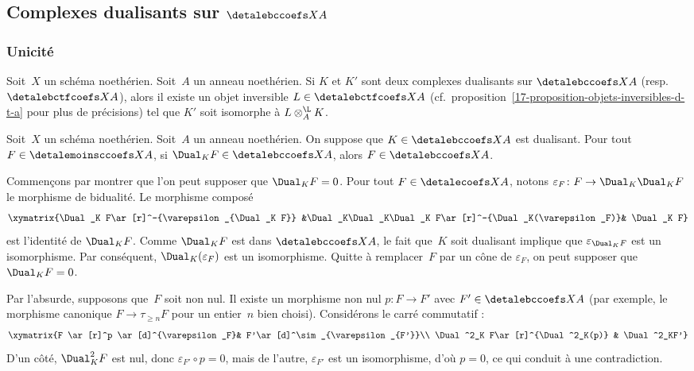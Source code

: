 \documentclass[10pt]{../fichiers-configuration-latex/smfart}
\begin{document}
\subsection{Complexes dualisants sur \texorpdfstring{$\detalebccoefs X A$}{Dbc(X,A)}}%
\subsubsection{Unicité}%

\begin{proposition3}\label{17-proposition-unicite-complexe-dualisant}
Soit $X$ un schéma noethérien. Soit $A$ un anneau noethérien. Si
$K$ et $K'$ sont deux complexes dualisants sur $\detalebccoefs X A$ (resp.
$\detalebctfcoefs X A$), alors il
existe un objet inversible $L\in\detalebctfcoefs X A$ 
(cf.~proposition~\ref{17-proposition-objets-inversibles-d-t-a} pour plus de
précisions) tel que $K'$ soit isomorphe à $L\otimes^{\L}_{A}K$.
\end{proposition3}

\begin{lemme3}\label{17-lemme-dual-dans-d-b-implique-dans-d-b}
Soit $X$ un schéma noethérien. Soit $A$ un anneau noethérien. On suppose
que $K\in\detalebccoefs X A$ est dualisant. Pour tout
$F\in\detalemoinsccoefs X A$, si $\Dual_K F\in\detalebccoefs X A$, alors
$F\in\detalebccoefs X A$.
\end{lemme3}

Commençons par montrer que l'on peut supposer que $\Dual_K F=0$. Pour tout
$F\in\detalecoefs X A$, notons $\varepsilon_F\colon F\to \Dual_K\Dual_K F$ le
morphisme de bidualité. Le morphisme composé
\[\xymatrix{\Dual_K F\ar[r]^-{\varepsilon_{\Dual_K F}} &\Dual_K\Dual_K\Dual_K
F\ar[r]^-{\Dual_K(\varepsilon_F)}& \Dual_K F}\]
est l'identité de $\Dual_K F$. Comme $\Dual_K F$ est dans $\detalebccoefs X A$,
le fait que $K$ soit dualisant implique que $\varepsilon_{\Dual_K F}$ est
un isomorphisme. Par conséquent, $\Dual_K(\varepsilon_F)$ est un
isomorphisme. Quitte à remplacer $F$ par un cône de $\varepsilon_F$, on
peut supposer que $\Dual_K F=0$.

Par l'absurde, supposons que $F$ soit non nul. Il existe un morphisme
non nul $p\colon F\to F'$ avec $F'\in\detalebccoefs X A$ (par exemple, le
morphisme canonique $F\to \tau_{\geq n}F$ pour un entier $n$ bien choisi).
Considérons le carré commutatif :
\[
\xymatrix{F \ar[r]^p \ar[d]^{\varepsilon_F}& F'\ar[d]^\sim_{\varepsilon_{F'}}\\
\Dual^2_K F\ar[r]^{\Dual^2_K(p)} & \Dual^2_KF'}
\]
D'un côté, $\Dual^2_K F$ est nul, donc $\varepsilon_{F'}\circ p=0$, mais de
l'autre, $\varepsilon_{F'}$ est un isomorphisme, d'où $p=0$, ce qui conduit
à une contradiction.
\end{document}
